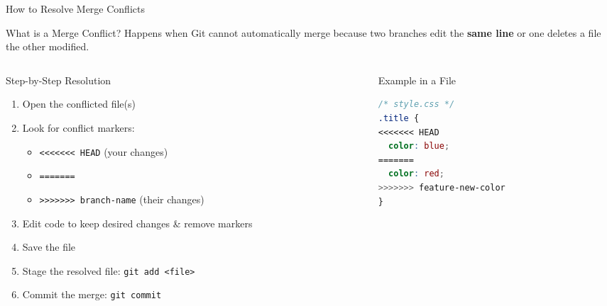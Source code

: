 \documentclass[aspectratio=169]{beamer}
\begin{document}
\begin{frame}[fragile]{How to Resolve Merge Conflicts}
  \begin{block}{What is a Merge Conflict?}
    Happens when Git cannot automatically merge because two branches edit the \textbf{same line} or one deletes a file the other modified.
  \end{block}
    
  \begin{columns}
    \begin{column}{0.5\textwidth}
      \begin{alertblock}{Step-by-Step Resolution}
        \begin{enumerate}
          \item Open the conflicted file(s)
          \item Look for conflict markers:
          \begin{itemize}
            \item \texttt{<<<<<<< HEAD} (your changes)
            \item \texttt{=======}
            \item \texttt{>>>>>>> branch-name} (their changes)
          \end{itemize}
          \item Edit code to keep desired changes \& remove markers
          \item Save the file
          \item Stage the resolved file: \texttt{git add <file>}
          \item Commit the merge: \texttt{git commit}
        \end{enumerate}
      \end{alertblock}
    \end{column}
    \begin{column}{0.45\textwidth}
      \begin{exampleblock}{Example in a File}
\begin{lstlisting}[language=css]
/* style.css */
.title {
<<<<<<< HEAD
  color: blue;
=======
  color: red;
>>>>>>> feature-new-color
}
\end{lstlisting}
      \end{exampleblock}
    \end{column}
  \end{columns}
\end{frame}
\end{document}
